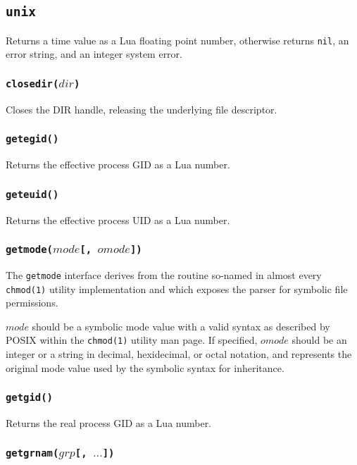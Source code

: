 \documentclass[11pt, oneside]{memoir}
\newcommand*{\nil}[0]{\texttt{nil}\xspace}
\newcommand*{\syscall}[1]{\texttt{#1}\xspace}
\newcommand*{\fn}[1]{\texttt{#1}\xspace}
\newcounter{toccols}
\newenvironment{Module}[1]{
	\subsection{\texttt{#1}}
	\addtocontents{toc}{
		\protect\begin{multicols}{\value{toccols}}
	}
}{
	\addtocontents{toc}{\protect\end{multicols}}
}
\begin{document}
\begin{Module}{unix}
Returns a time value as a Lua floating point number, otherwise returns \nil, an error string, and an integer system error.

\subsubsection[\fn{closedir}]{\fn{closedir($dir$)}}

Closes the DIR handle, releasing the underlying file descriptor.

\subsubsection[\fn{getegid}]{\fn{getegid()}}

Returns the effective process GID as a Lua number.

\subsubsection[\fn{geteuid}]{\fn{geteuid()}}

Returns the effective process UID as a Lua number.

\subsubsection[\fn{getmode}]{\fn{getmode($mode$[, $omode$])}}

The \fn{getmode} interface derives from the routine so-named in almost every \texttt{chmod(1)} utility implementation and which exposes the parser for symbolic file permissions.

$mode$ should be a symbolic mode value with a valid syntax as described by POSIX within the \syscall{chmod(1)} utility man page. If specified, $omode$ should be an integer or a string in decimal, hexidecimal, or octal notation, and represents the original mode value used by the symbolic syntax for inheritance.

\subsubsection[\fn{getgid}]{\fn{getgid()}}

Returns the real process GID as a Lua number.

\subsubsection[\fn{getgrnam}]{\fn{getgrnam($grp$[, $\ldots$])}}


\end{Module}
\end{document}
